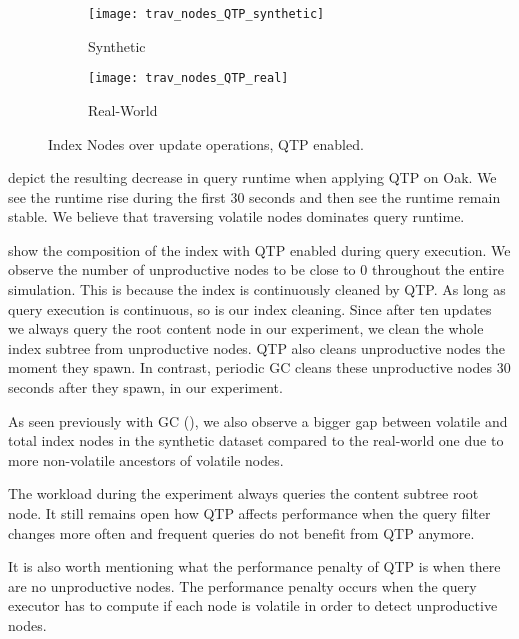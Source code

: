 \documentclass[abstracton,12pt]{scrartcl}
\theoremstyle{definition}
\begin{document}
\begin{figure}[h]
  \centering
  \begin{subfigure}{0.49\linewidth}
    \centering
    \caption{Synthetic}
    \texttt{[image: trav\_nodes\_QTP\_synthetic]}
    \label{fig:trav_nodes_QTP_synthetic}
  \end{subfigure}
  \begin{subfigure}{0.49\linewidth}
    \centering
    \caption{Real-World}
    \texttt{[image: trav\_nodes\_QTP\_real]}
    \label{fig:trav_nodes_QTP_real}
  \end{subfigure}
  \vspace{-0.5cm}
  \caption{Index Nodes over update operations, QTP enabled.}
\end{figure}

 depict the
resulting decrease in query runtime when applying QTP on Oak. We see the runtime
rise during the first 30 seconds and then see the runtime remain stable.
We believe that traversing volatile nodes dominates query runtime. 

 show the composition
of the index with QTP enabled during query execution. We observe the number of
unproductive nodes to be close to 0 throughout the entire simulation. This is
because the index is continuously cleaned by QTP. As long as query execution is
continuous, so is our index cleaning. Since after ten updates we always query the root content
node in our experiment, we clean the whole index subtree from unproductive nodes.
QTP also cleans unproductive nodes the moment they spawn. In contrast, periodic GC
cleans these unproductive nodes 30 seconds after they spawn, in our experiment.

As seen previously with GC (), 
we also observe a bigger gap between volatile and total
index nodes in the synthetic dataset compared to the real-world one due to
more non-volatile ancestors of volatile nodes.

The workload during the experiment always queries the content subtree root node. 
It still remains open how QTP affects performance when the query filter changes 
more often and frequent queries do not benefit from QTP anymore.

It is also worth mentioning what the performance penalty of QTP is when
there are no unproductive nodes.
The performance penalty occurs when the query executor has to compute if each
node is volatile in order to detect unproductive nodes.
\end{document}
